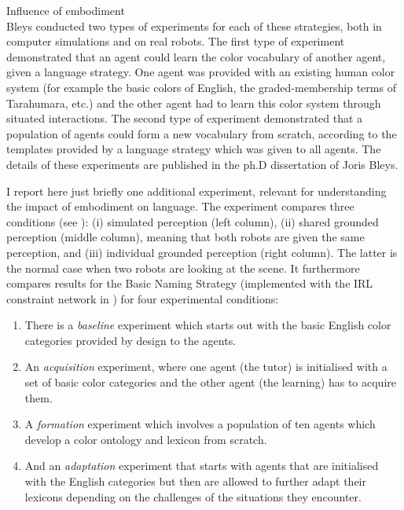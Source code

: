{\bfshape Influence of embodiment}\\

Bleys conducted two types of experiments for each of these strategies, both in computer simulations and on 
real robots. The first type of experiment demonstrated that an agent could learn the color vocabulary of another agent, 
given a language strategy. One agent was provided with an existing human color system (for example the basic colors 
of English, the graded-membership terms of Tarahumara, etc.) and the other agent had to learn this color system through
situated interactions. The second type of experiment demonstrated that a population of agents could form a new 
vocabulary from scratch, according to the templates provided by a language strategy which was given to all agents. 
The details of these experiments are published in the ph.D dissertation of Joris Bleys.\cite{Bleys:2014}

I report here just briefly one additional experiment, relevant for understanding 
the impact of embodiment on language. The experiment compares three conditions (see ): 
(i) simulated perception (left column), (ii) shared grounded perception (middle column), meaning that both robots 
are given the same perception, and (iii) individual grounded 
perception (right column). The latter is the normal case when two robots are looking at the scene. 
It furthermore compares results for the Basic Naming Strategy (implemented with the IRL constraint network in 
) for four experimental conditions: 
\begin{enumerate}
\item There is a {\itshape baseline} experiment which starts out with the basic English color categories provided 
by design to the agents. 
\item An {\itshape acquisition} experiment, where one agent (the tutor) is initialised with a set of basic color categories and 
the other agent (the learning) has to acquire them. 
\item A {\itshape formation} experiment which involves a population of ten agents which develop a 
color ontology and lexicon from scratch. 
\item And an {\itshape adaptation} experiment that starts with agents that are initialised with the 
English categories but then are allowed to further adapt their lexicons depending on the challenges of the situations 
they encounter. 
\end{enumerate}

